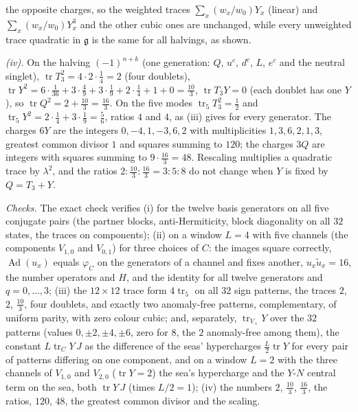 the opposite charges, so the weighted traces $\sum_{x}(w_{x}/w_{0})Y_{x}$ (linear) and $\sum_{x}(w_{x}/w_{0})Y_{x}^{3}$ and the other cubic ones are unchanged, while every unweighted trace quadratic in $\mathfrak{g}$ is the same for all halvings, as shown.

\emph{(iv).} On the halving $(-1)^{n+k}$ (one generation: $Q$, $u^{c}$, $d^{c}$, $L$, $e^{c}$ and the neutral singlet), $\operatorname{tr}T_{3}^{2} = 4\cdot 2\cdot\tfrac14 = 2$ (four doublets), $\operatorname{tr}Y^{2} = 6\cdot\tfrac{1}{36} + 3\cdot\tfrac49 + 3\cdot\tfrac19 + 2\cdot\tfrac14 + 1 + 0 = \tfrac{10}{3}$, $\operatorname{tr}T_{3}Y = 0$ (each doublet has one $Y$), so $\operatorname{tr}Q^{2} = 2 + \tfrac{10}{3} = \tfrac{16}{3}$. On the five modes $\operatorname{tr}_{5}T_{3}^{2} = \tfrac12$ and $\operatorname{tr}_{5}Y^{2} = 2\cdot\tfrac14 + 3\cdot\tfrac19 = \tfrac56$, ratios $4$ and $4$, as (iii) gives for every generator. The charges $6Y$ are the integers $0, -4, 1, -3, 6, 2$ with multiplicities $1, 3, 6, 2, 1, 3$, greatest common divisor $1$ and squares summing to $120$; the charges $3Q$ are integers with squares summing to $9\cdot\tfrac{16}{3} = 48$. Rescaling multiplies a quadratic trace by $\lambda^{2}$, and the ratios $2 : \tfrac{10}{3} : \tfrac{16}{3} = 3 : 5 : 8$ do not change when $Y$ is fixed by $Q = T_{3} + Y$.

\emph{Checks.} The exact check verifies (i) for the twelve basis generators on all five conjugate pairs (the partner blocks, anti-Hermiticity, block diagonality on all $32$ states, the traces on components); (ii) on a window $L = 4$ with five channels (the components $V_{1,0}$ and $V_{0,1}$) for three choices of $C$: the images square correctly, $\operatorname{Ad}(u_{x})$ equals $\varphi_{C}$ on the generators of a channel and fixes another, $u_{x}\tilde u_{x} = 16$, the number operators and $H$, and the identity for all twelve generators and $q = 0, \dots, 3$; (iii) the $12 \times 12$ trace form $4\operatorname{tr}_{5}$ on all $32$ sign patterns, the traces $2$, $2$, $\tfrac{10}{3}$, four doublets, and exactly two anomaly-free patterns, complementary, of uniform parity, with zero colour cubic; and, separately, $\operatorname{tr}_{V_{+}}Y$ over the $32$ patterns (values $0, \pm2, \pm4, \pm6$, zero for $8$, the $2$ anomaly-free among them), the constant $L\operatorname{tr}_{C}Y\,J$ as the difference of the seas' hypercharges $\tfrac{L}{2}\operatorname{tr}Y$ for every pair of patterns differing on one component, and on a window $L = 2$ with the three channels of $V_{1,0}$ and $V_{2,0}$ ($\operatorname{tr}Y = 2$) the sea's hypercharge and the $Y$-$N$ central term on the sea, both $\operatorname{tr}Y\,J$ (times $L/2 = 1$); (iv) the numbers $2$, $\tfrac{10}{3}$, $\tfrac{16}{3}$, the ratios, $120$, $48$, the greatest common divisor and the scaling.
